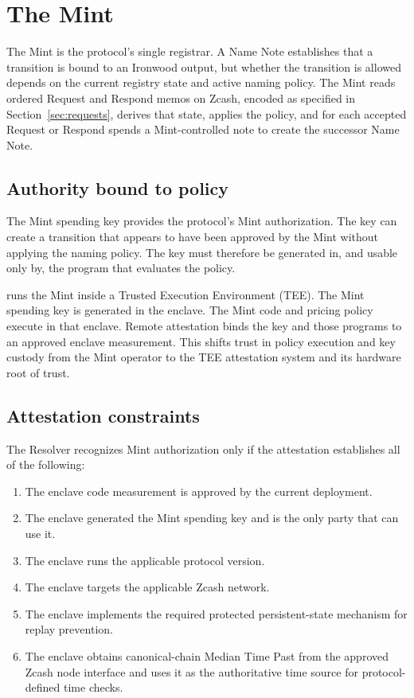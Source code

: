 \section{The Mint}
\label{sec:the-mint}

The Mint is the protocol's single registrar. A Name Note establishes that a transition is bound to an Ironwood output, but whether the transition is allowed depends on the current registry state and active naming policy. The Mint reads ordered Request and Respond memos on Zcash, encoded as specified in Section~\ref{sec:requests}, derives that state, applies the policy, and for each accepted Request or Respond spends a Mint-controlled note to create the successor Name Note.

\subsection{Authority bound to policy}

The Mint spending key provides the protocol's Mint authorization. The key can create a transition that appears to have been approved by the Mint without applying the naming policy. The key must therefore be generated in, and usable only by, the program that evaluates the policy.

\zns{} runs the Mint inside a Trusted Execution Environment (TEE). The Mint spending key is generated in the enclave. The Mint code and pricing policy execute in that enclave. Remote attestation binds the key and those programs to an approved enclave measurement. This shifts trust in policy execution and key custody from the Mint operator to the TEE attestation system and its hardware root of trust.

\subsection{Attestation constraints}

The Resolver recognizes Mint authorization only if the attestation establishes all of the following:

\begin{enumerate}
  \item The enclave code measurement is approved by the current \zns{} deployment.
  \item The enclave generated the Mint spending key and is the only party that can use it.
  \item The enclave runs the applicable \zns{} protocol version.
  \item The enclave targets the applicable Zcash network.
  \item The enclave implements the required protected persistent-state mechanism for replay prevention.
  \item The enclave obtains canonical-chain Median Time Past from the approved Zcash node interface and uses it as the authoritative time source for protocol-defined time checks.
\end{enumerate}

